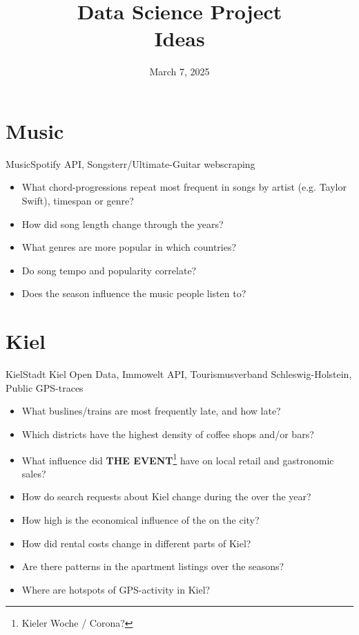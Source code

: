 

\title[Data Science Project: Ideas]{Data Science Project \\ \small Ideas}
\date{March 7, 2025}


    \maketitle
    

    \section{Music}
    \begin{frame}{Music}{Spotify API, Songsterr/Ultimate-Guitar webscraping}
        \begin{itemize}[<+->]
            \item What chord-progressions repeat most frequent in songs by artist (e.g. Taylor Swift), timespan or genre?
            \item How did song length change through the years?
            \item What genres are more popular in which countries?
            \item Do song tempo and popularity correlate?
            \item Does the season influence the music people listen to?
        \end{itemize}
    \end{frame}

    \section{Kiel}
    \begin{frame}{Kiel}{Stadt Kiel Open Data, Immowelt API, Tourismusverband Schleswig-Holstein, Public GPS-traces}
        \begin{itemize}[<+->]
            \item What buslines/trains are most frequently late, and how late?
            \item Which districts have the highest density of coffee shops and/or bars?
            \item What influence did \alert{\textsc{\bfseries THE EVENT}}\footnote{Kieler Woche / Corona?} have on local retail and gastronomic sales?
            \item How do search requests about Kiel change during the  over the year?
            \item How high is the economical influence of the  on the city?
            \item How did rental costs change in different parts of Kiel?
            \item Are there patterns in the apartment listings over the seasons?
            \item Where are hotspots of GPS-activity in Kiel?
        \end{itemize}
    \end{frame}
